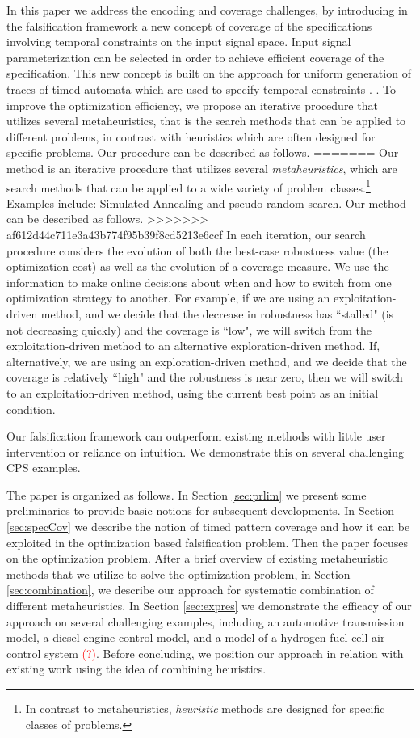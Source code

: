 In this paper we address the encoding and coverage challenges, by introducing in the falsification framework a new concept of
coverage of the specifications involving temporal constraints on the input signal space. Input signal parameterization can be selected in order to achieve
efficient coverage of the specification. This new concept is built on the approach for uniform
generation of traces of timed automata which are used to specify temporal constraints  \cite{}.
. To improve the optimization efficiency, we propose an iterative procedure that utilizes several
metaheuristics, that is the search methods that can be applied to
different problems, in contrast with heuristics which are often
designed for specific problems. Our procedure can be described as follows. 
=======
Our method is an iterative procedure that utilizes several 
\emph{metaheuristics}, which are search methods that can be applied to
a wide variety of problem classes.\footnote{In contrast to metaheuristics, \emph{heuristic} methods are 
designed for specific classes of problems.} Examples include: Simulated Annealing and pseudo-random search. Our method can be described as follows. 
>>>>>>> af612d44c711e3a43b774f95b39f8cd5213e6ccf
In each iteration, our
search procedure considers the evolution of both the best-case
robustness value (the optimization cost) as well as the evolution of a
coverage measure.  We use the information to make online decisions
about when and how to switch from one optimization strategy to
another.  For example, if we are using an exploitation-driven method,
and we decide that the decrease in robustness has ``stalled" (is not
decreasing quickly) and the coverage is ``low", we will switch from
the exploitation-driven method to an alternative exploration-driven
method.  If, alternatively, we are using an exploration-driven method,
and we decide that the coverage is relatively ``high" and the
robustness is near zero, then we will switch to an exploitation-driven
method, using the current best point as an initial condition.
 
Our falsification framework can outperform existing methods with little user intervention or reliance on intuition. We demonstrate this on several 
challenging CPS examples.

The paper is organized as follows. In Section \ref{sec:prlim} we present some preliminaries to provide basic notions for subsequent developments. In Section \ref{sec:specCov} we describe the notion of timed pattern coverage and how it can be exploited in the optimization based falsification problem. Then the paper focuses on the optimization problem. After a brief overview of existing metaheuristic methods that we utilize to solve the optimization problem, in Section \ref{sec:combination}, we describe our approach for systematic combination of different metaheuristics. In Section \ref{sec:expres} we demonstrate the efficacy of our approach on several challenging examples, including an automotive transmission model, a diesel engine control model, and a model of a hydrogen fuel cell air control system \textcolor{red}{(?)}. Before concluding, we position our approach in relation with existing work using the idea of combining heuristics. 

